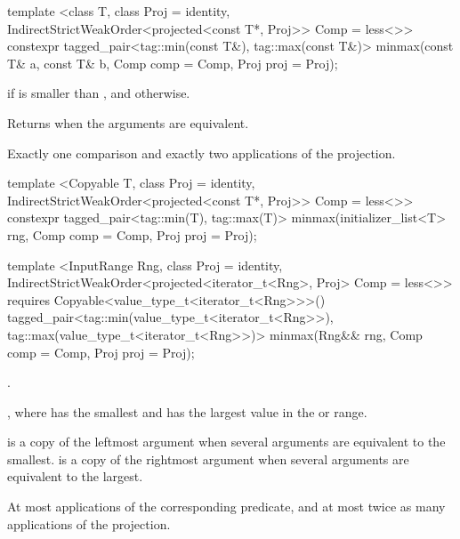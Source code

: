 %
\begin{itemdecl}
template <class T, class Proj = identity,
    IndirectStrictWeakOrder<projected<const T*, Proj>> Comp = less<>>
  constexpr tagged_pair<tag::min(const T&), tag::max(const T&)>
    minmax(const T& a, const T& b, Comp comp = Comp{}, Proj proj = Proj{});
\end{itemdecl}

\begin{itemdescr}
\pnum
\returns
{} if  is smaller
than , and
 otherwise.

\pnum
\notes
Returns  when the arguments are equivalent.

\pnum
\complexity
Exactly one comparison and exactly two applications of the projection.
\end{itemdescr}

%
\begin{itemdecl}
template <Copyable T, class Proj = identity,
    IndirectStrictWeakOrder<projected<const T*, Proj>> Comp = less<>>
  constexpr tagged_pair<tag::min(T), tag::max(T)>
    minmax(initializer_list<T> rng, Comp comp = Comp{}, Proj proj = Proj{});

template <InputRange Rng, class Proj = identity,
    IndirectStrictWeakOrder<projected<iterator_t<Rng>, Proj> Comp = less<>>
  requires Copyable<value_type_t<iterator_t<Rng>>>()
  tagged_pair<tag::min(value_type_t<iterator_t<Rng>>),
              tag::max(value_type_t<iterator_t<Rng>>)>
    minmax(Rng&& rng, Comp comp = Comp{}, Proj proj = Proj{});
\end{itemdecl}

\begin{itemdescr}
\pnum
\requires {}.

\pnum
\returns {}, where  has the smallest and  has the
largest value in the  or range.

\pnum
\remarks {} is a copy of the leftmost argument when several arguments are equivalent to
the smallest.  is a copy of the rightmost argument when several arguments are
equivalent to the largest.

\pnum
\complexity At most 
applications of the corresponding predicate, and at most twice as many applications of the projection.
\end{itemdescr}

